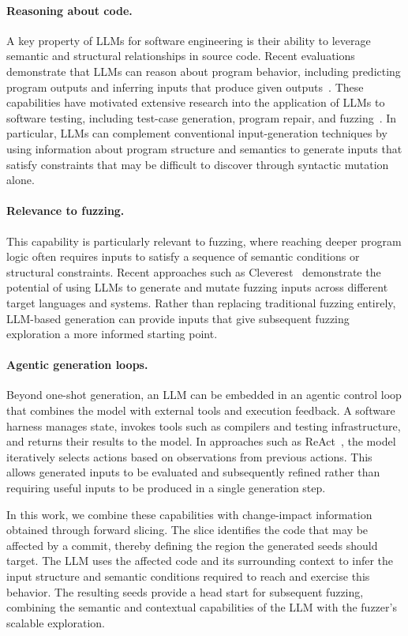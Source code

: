 \paragraph{Reasoning about code.}
A key property of \acp{LLM} for software engineering is their ability to
leverage semantic and structural relationships in source code. Recent
evaluations demonstrate that \acp{LLM} can reason about program behavior,
including predicting program outputs and inferring inputs that produce given
outputs~\cite{guCRUXEvalBenchmarkCode2024}. These capabilities have motivated
extensive research into the application of \acp{LLM} to software testing,
including test-case generation, program repair, and
fuzzing~\cite{wangSoftwareTestingLarge2024}. In particular, \acp{LLM} can
complement conventional input-generation techniques by using information about
program structure and semantics to generate inputs that satisfy constraints that
may be difficult to discover through syntactic mutation alone.

\paragraph{Relevance to fuzzing.}
This capability is particularly relevant to fuzzing, where reaching deeper
program logic often requires inputs to satisfy a sequence of semantic conditions
or structural constraints. Recent approaches such as
Cleverest~\cite{liuEvaluatingLLMBasedRegression2026} demonstrate the potential of
using \acp{LLM} to generate and mutate fuzzing inputs across different target
languages and systems. Rather than replacing traditional fuzzing entirely,
LLM-based generation can provide inputs that give subsequent fuzzing exploration
a more informed starting point.

\paragraph{Agentic generation loops.}
Beyond one-shot generation, an \ac{LLM} can be embedded in an agentic control
loop that combines the model with external tools and execution feedback. A
software harness manages state, invokes tools such as compilers and testing
infrastructure, and returns their results to the model. In approaches such as
ReAct~\cite{yaoReActSynergizingReasoning2023}, the model iteratively selects
actions based on observations from previous actions. This allows generated
inputs to be evaluated and subsequently refined rather than requiring useful
inputs to be produced in a single generation step.

\bigskip
In this work, we combine these capabilities with change-impact information
obtained through forward slicing. The slice identifies the code that may be
affected by a commit, thereby defining the region the generated seeds should
target. The \ac{LLM} uses the affected code and its surrounding context to infer
the input structure and semantic conditions required to reach and exercise this
behavior. The resulting seeds provide a head start for subsequent fuzzing,
combining the semantic and contextual capabilities of the \ac{LLM} with the
fuzzer's scalable exploration.